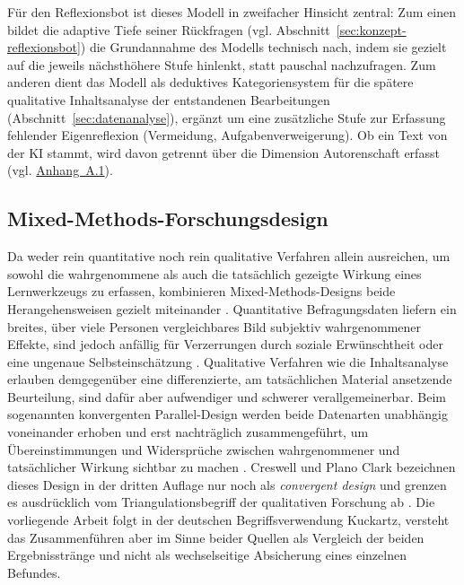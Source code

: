 Für den Reflexionsbot ist dieses Modell in zweifacher Hinsicht zentral: Zum einen bildet die
adaptive Tiefe seiner Rückfragen (vgl. Abschnitt~\ref{sec:konzept-reflexionsbot}) die
Grundannahme des Modells technisch nach, indem sie gezielt auf die jeweils nächsthöhere Stufe
hinlenkt, statt pauschal nachzufragen. Zum anderen dient das Modell als deduktives
Kategoriensystem für die spätere qualitative Inhaltsanalyse der entstandenen Bearbeitungen
(Abschnitt~\ref{sec:datenanalyse}), ergänzt um eine zusätzliche Stufe zur Erfassung fehlender
Eigenreflexion (Vermeidung, Aufgabenverweigerung). Ob ein Text von der KI stammt, wird davon
getrennt über die Dimension Autorenschaft erfasst (vgl. \hyperref[app:kategoriensystem]{Anhang~A.1}).

\subsection{Mixed-Methods-Forschungsdesign}
\label{sec:mixed-methods-grundlagen}
Da weder rein quantitative noch rein qualitative Verfahren allein ausreichen, um sowohl die
wahrgenommene als auch die tatsächlich gezeigte Wirkung eines Lernwerkzeugs zu erfassen, kombinieren
Mixed-Methods-Designs beide Herangehensweisen gezielt miteinander \cite{kuckartzMixedMethodsMethodologie2014, creswellDesigningConductingMixed2018}.
Quantitative Befragungsdaten liefern ein breites, über viele Personen vergleichbares Bild
subjektiv wahrgenommener Effekte, sind jedoch anfällig für Verzerrungen durch soziale Erwünschtheit
oder eine ungenaue Selbsteinschätzung \cite{doeringForschungsmethodenEvaluationSozial2023}. Qualitative Verfahren wie die Inhaltsanalyse erlauben
demgegenüber eine differenzierte, am tatsächlichen Material ansetzende Beurteilung, sind dafür aber
aufwendiger und schwerer verallgemeinerbar. Beim sogenannten konvergenten Parallel-Design werden
beide Datenarten unabhängig voneinander erhoben und erst nachträglich zusammengeführt, um
Übereinstimmungen und Widersprüche zwischen wahrgenommener und tatsächlicher
Wirkung sichtbar zu machen \cite{kuckartzMixedMethodsMethodologie2014, creswellDesigningConductingMixed2018}.
Creswell und Plano Clark bezeichnen dieses Design in der dritten Auflage nur noch als
\emph{convergent design} und grenzen es ausdrücklich vom Triangulationsbegriff der qualitativen
Forschung ab \cite{creswellDesigningConductingMixed2018}. Die vorliegende Arbeit folgt in der
deutschen Begriffsverwendung Kuckartz, versteht das Zusammenführen aber im Sinne beider Quellen als
Vergleich der beiden Ergebnisstränge und nicht als wechselseitige Absicherung eines einzelnen
Befundes.

